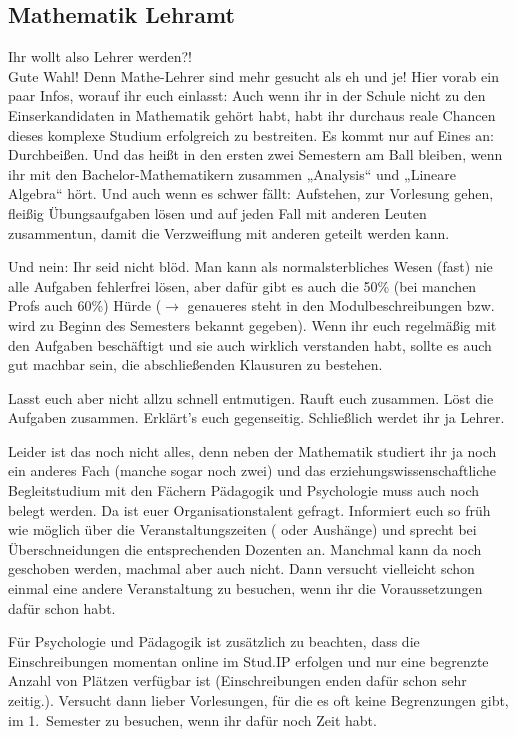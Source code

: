 \subsection{Mathematik Lehramt}

Ihr wollt also Lehrer werden?!\\
Gute Wahl! Denn Mathe-Lehrer sind mehr gesucht als eh und je! 
Hier vorab ein paar Infos, worauf ihr euch einlasst: Auch wenn ihr in der Schule nicht zu den Einserkandidaten in Mathematik gehört habt, habt ihr durchaus reale Chancen dieses komplexe Studium erfolgreich zu bestreiten.
Es kommt nur auf Eines an: Durchbeißen.
Und das heißt in den ersten zwei Semestern am Ball bleiben, wenn ihr mit den Bachelor-Mathematikern zusammen „Analysis“ und „Lineare Algebra“ hört.
Und auch wenn es schwer fällt:
Aufstehen, zur Vorlesung gehen, fleißig Übungsaufgaben lösen und auf jeden Fall mit anderen Leuten zusammentun, damit die Verzweiflung mit anderen geteilt werden kann.

Und nein: Ihr seid nicht blöd.
Man kann als normalsterbliches Wesen (fast) nie alle Aufgaben fehlerfrei lösen, aber dafür gibt es auch die 50\% (bei manchen Profs auch 60\%) Hürde ($\rightarrow$  genaueres steht in den Modulbeschreibungen bzw. wird zu Beginn des Semesters bekannt gegeben).
Wenn ihr euch regelmäßig mit den Aufgaben beschäftigt und sie auch wirklich verstanden habt, sollte es auch gut machbar sein, die abschließenden Klausuren zu bestehen.

Lasst euch aber nicht allzu schnell entmutigen.
Rauft euch zusammen.
Löst die Aufgaben zusammen.
Erklärt’s euch gegenseitig.
Schließlich werdet ihr ja Lehrer.

Leider ist das noch nicht alles, denn neben der Mathematik studiert ihr ja noch ein anderes Fach (manche sogar noch zwei) und das erziehungswissenschaftliche Begleitstudium mit den Fächern Pädagogik und Psychologie muss auch noch belegt werden.
Da ist euer Organisationstalent gefragt.
Informiert euch so früh wie möglich über die Veranstaltungszeiten ( oder Aushänge) und sprecht bei Überschneidungen die entsprechenden Dozenten an.
Manchmal kann da noch geschoben werden, machmal aber auch nicht.
Dann versucht vielleicht schon einmal eine andere Veranstaltung zu besuchen, wenn ihr die Voraussetzungen dafür schon habt.

Für Psychologie und Pädagogik ist zusätzlich zu beachten, dass die Einschreibungen momentan online im Stud.IP erfolgen und nur eine begrenzte Anzahl von Plätzen verfügbar ist (Einschreibungen enden dafür schon sehr zeitig.).
Versucht dann lieber Vorlesungen, für die es oft keine Begrenzungen gibt, im 1.~Semester zu besuchen, wenn ihr dafür noch Zeit habt.

